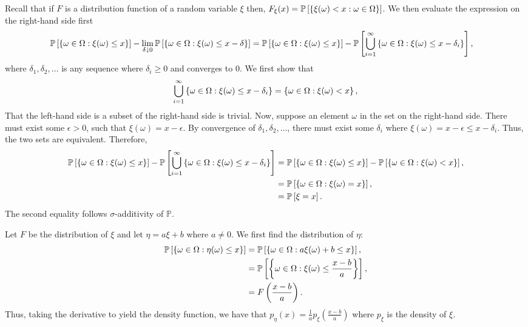 \begin{solution}
    Recall that if $F$ is a distribution function of a random variable $\xi$
    then, $F_\xi(x) = \mathbb{P}\left[{\left\{ \xi(\omega) < x: \omega \in
    \Omega \right\}}\right]$. We then evaluate the expression on the right-hand side
    first 
    \begin{align*}
        \mathbb{P}\left[{\left\{ \omega \in \Omega: \xi(\omega) \leq x \right\}}\right] - \lim_{\delta \downarrow 0} \mathbb{P}\left[{\left\{ \omega \in \Omega: \xi(\omega) \leq x-\delta \right\}}\right] &= \mathbb{P}\left[{\left\{ \omega \in \Omega: \xi(\omega) \leq x \right\}}\right] - \mathbb{P}\left[{\bigcup_{i=1}^\infty \left\{ \omega \in \Omega: \xi(\omega) \leq x - \delta_i \right\}}\right],
    \end{align*}
    where $\delta_1, \delta_2, \ldots$ is any sequence where $\delta_i \geq 0$
    and converges to 0. We first show that \[\bigcup_{i=1}^\infty \left\{ \omega
    \in \Omega: \xi(\omega) \leq x - \delta_i \right\} = \left\{ \omega \in \Omega:
    \xi(\omega) < x \right\},\] That the left-hand side is a subset of the right-hand
    side is trivial. Now, suppose an element $\omega$ in the set on the
    right-hand side. There must exist some $\epsilon > 0$, such that
    $\xi(\omega) = x - \epsilon$. By convergence of $\delta_1,\delta_2,\ldots$,
    there must exist some $\delta_i$ where $\xi(\omega) = x - \epsilon \leq x -
    \delta_i$. Thus, the two sets are equivalent. Therefore, 
    \begin{align*}
        \mathbb{P}\left[{\left\{ \omega \in \Omega: \xi(\omega) \leq x \right\}}\right] - \mathbb{P}\left[{\bigcup_{i=1}^\infty \left\{ \omega \in \Omega: \xi(\omega) \leq x - \delta_i \right\}}\right] &= \mathbb{P}\left[{\left\{ \omega \in \Omega: \xi(\omega) \leq x \right\}}\right] - \mathbb{P}\left[{\left\{ \omega \in \Omega: \xi(\omega) < x \right\}}\right], \\
        &= \mathbb{P}\left[{\left\{ \omega \in \Omega: \xi(\omega) = x \right\}}\right], \\
        &= \mathbb{P}\left[{\xi = x}\right].
    \end{align*}
    The second equality follows $\sigma$-additivity of $\mathbb{P}$.
\end{solution}
\begin{problem}{10}
\end{problem}
\begin{solution}
    Let $F$ be the distribution of $\xi$ and let $\eta = a\xi + b$ where $a\neq
    0$. We first find the distribution of $\eta$:
    \begin{align*}
        \mathbb{P}\left[{\left\{ \omega \in \Omega: \eta(\omega) \leq x \right\}}\right] &= \mathbb{P}\left[{\left\{ \omega \in \Omega: a\xi(\omega) + b \leq x \right\}}\right], \\
        &= \mathbb{P}\left[{\left\{ \omega\in\Omega:\xi(\omega) \leq \frac{x-b}{a} \right\}}\right], \\
        &= F\left(\frac{x-b}{a}\right).
    \end{align*}
    Thus, taking the derivative to yield the density function, we have that
    $p_\eta(x) = \frac{1}{a}p_\xi\left(\frac{x-b}{a}\right)$ where $p_\xi$ is
    the density of $\xi$. 
\end{solution}
